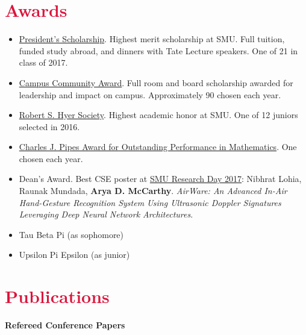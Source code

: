 \documentclass[margin, 10pt]{res} %
\let\oldsection\section
\renewcommand{\section}[1]{\oldsection{\textcolor{crimson}{#1}}}
\begin{document}
\begin{resume}

\section{Awards}

\begin{itemize}
\item \href{https://www.smu.edu/Academics/PS}{President's Scholarship}. Highest merit scholarship at SMU\@. Full tuition, funded study abroad, and dinners with Tate Lecture speakers. One of 21 in class of 2017.
\item \href{https://www.smu.edu/Academics/PS/Benefits}{Campus Community Award}. Full room and board scholarship awarded for leadership and impact on campus. Approximately 90 chosen each year.
\item \href{https://www.smu.edu/EnrollmentServices/Registrar/AcademicCeremonies/HonorsConvocation/HonorSocieties}{Robert S. Hyer Society}. Highest academic honor at SMU\@. One of 12 juniors selected in 2016.
\item \href{https://www.smu.edu/EnrollmentServices/Registrar/AcademicCeremonies/HonorsConvocation/AwardRecipients}{Charles J. Pipes Award for Outstanding Performance in Mathematics}. One chosen each year.
\item Dean's Award. Best CSE poster at \href{http://www.smu.edu/graduate/CurrentStudents/ResearchDay}{SMU Research Day 2017}: Nibhrat Lohia, Raunak Mundada, \textbf{Arya D. McCarthy}. \emph{AirWare: An Advanced In-Air Hand-Gesture Recognition System Using Ultrasonic Doppler Signatures Leveraging Deep Neural Network Architectures}.
\item Tau Beta Pi (as sophomore)
\item Upsilon Pi Epsilon (as junior)
\end{itemize}


\section{Publications}

\textbf{Refereed Conference Papers}


\end{resume}
\end{document}
